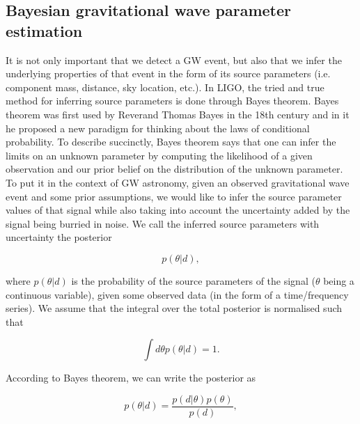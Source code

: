 \subsection{Bayesian gravitational wave parameter estimation}

%
%

%
%
It is not only important that we detect a \ac{GW} event, but also that we infer the underlying properties of that event in the form of its source parameters (i.e. component mass, distance, sky location, etc.). In \ac{LIGO}, the tried and true method for inferring source parameters is done through Bayes theorem. Bayes theorem was first used by Reverand Thomas Bayes in the 18th century and in it he proposed a new paradigm for thinking about the laws of conditional probability. To describe succinctly, Bayes theorem says that one can infer the limits on an unknown parameter by computing the likelihood of a given observation and our prior belief on the distribution of the unknown parameter. To put it in the context of \ac{GW} astronomy, given an observed gravitational wave event and some prior assumptions, we would like to infer the source parameter values of that signal while also taking into account the uncertainty added by the signal being burried in noise. We call the inferred source parameters with uncertainty the posterior 

%
%
\begin{equation}
    p(\theta | d),
\end{equation}

where $p(\theta | d)$ is the probability of the source parameters of the signal ($\theta$ being a continuous variable), given some observed data (in the form of a time/frequency series). We assume that the integral over the total posterior is normalised such that 

%
%
\begin{equation}
    \int d\theta p(\theta | d) = 1.
\end{equation}

According to Bayes theorem, we can write the posterior as 

%
%
\begin{equation}
    p(\theta | d) = \frac{p(d|\theta)p(\theta)}{p(d)},
\end{equation}

